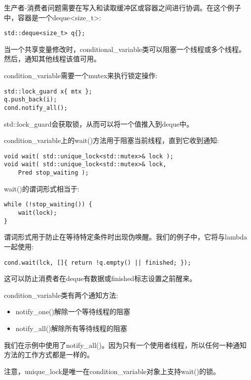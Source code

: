 生产者-消费者问题需要在写入和读取缓冲区或容器之间进行协调。在这个例子中，容器是一个deque<size\_t>:

\begin{lstlisting}[style=styleCXX]
std::deque<size_t> q{};
\end{lstlisting}

当一个共享变量修改时，conditional\_variable类可以阻塞一个线程或多个线程。然后，通知其他线程该值可用。

condition\_variable需要一个mutex来执行锁定操作:

\begin{lstlisting}[style=styleCXX]
std::lock_guard x{ mtx };
q.push_back(i);
cond.notify_all();
\end{lstlisting}

std::lock\_guard会获取锁，从而可以将一个值推入到deque中。

condition\_variable上的wait()方法用于阻塞当前线程，直到它收到通知:

\begin{lstlisting}[style=styleCXX]
void wait( std::unique_lock<std::mutex>& lock );
void wait( std::unique_lock<std::mutex>& lock,
	Pred stop_waiting );
\end{lstlisting}

wait()的谓词形式相当于:

\begin{lstlisting}[style=styleCXX]
while (!stop_waiting()) {
	wait(lock);
}
\end{lstlisting}

谓词形式用于防止在等待特定条件时出现伪唤醒。我们的例子中，它将与lambda一起使用:

\begin{lstlisting}[style=styleCXX]
cond.wait(lck, []{ return !q.empty() || finished; });
\end{lstlisting}

这可以防止消费者在deque有数据或finished标志设置之前醒来。

condition\_variable类有两个通知方法:

\begin{itemize}
\item 
notify\_one()解除一个等待线程的阻塞

\item 
notify\_all()解除所有等待线程的阻塞
\end{itemize}

我们在示例中使用了notify\_all()。因为只有一个使用者线程，所以任何一种通知方法的工作方式都是一样的。

\begin{tcolorbox}[colback=webgreen!5!white,colframe=webgreen!75!black,title=Note]
注意，unique\_lock是唯一在condition\_variable对象上支持wait()的锁。
\end{tcolorbox}






